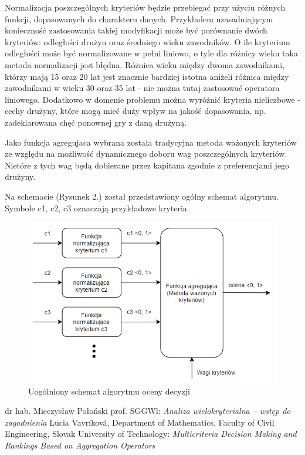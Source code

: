 \documentclass[a4paper,11pt]{article}
\begin{document}
 Normalizacja poszczególnych kryteriów będzie przebiegać przy użyciu różnych funkcji, dopasowanych do charakteru danych. Przykładem uzasadniającym konieczność zastosowania takiej modyfikacji może być porównanie dwóch kryteriów: odległości drużyn oraz średniego wieku zawodników. O ile kryterium odległości może być normalizowane w pełni liniowo, o tyle dla różnicy wieku taka metoda normalizacji jest błędna. Różnica wieku między dwoma zawodnikami, którzy mają 15 oraz 20 lat jest znacznie bardziej istotna aniżeli różnica między zawodnikami w wieku 30 oraz 35 lat - nie można tutaj zastosować operatora liniowego. Dodatkowo w domenie problemu można wyróżnić kryteria nieliczbowe - cechy drużyny, które mogą mieć duży wpływ na jakość dopasowania, np. zadeklarowana chęć ponownej gry z daną drużyną.   

Jako funkcja agregujaca wybrana została tradycyjna metoda ważonych kryteriów ze względu na możliwość dynamicznego doboru wag poszczególnych kryteriów. Nietóre z tych wag będą dobierane przez kapitana zgodnie z preferencjami jego drużyny.

Na schemacie (Rysunek 2.) został przedstawiony ogólny schemat algorytmu. Symbole c1, c2, c3 oznaczają przykładowe kryteria.

\begin{figure}[H]
\centering
\includegraphics[width=15cm]{algorytm-2.PNG}
\caption{Uogólniony schemat algorytmu oceny decyzji}
\end{figure}




\begin{thebibliography}{99}
dr hab. Mieczysław Połoński prof. SGGWl:
\emph{Analiza wielokryterialna – wstęp do zagadnienia}
Lucia Vavríková,  Department of Mathematics, Faculty of Civil Engineering, Slovak University of Technology:
\emph{Multicriteria Decision Making and Rankings Based on Aggregation Operators}
\end{thebibliography}
\end{document}

